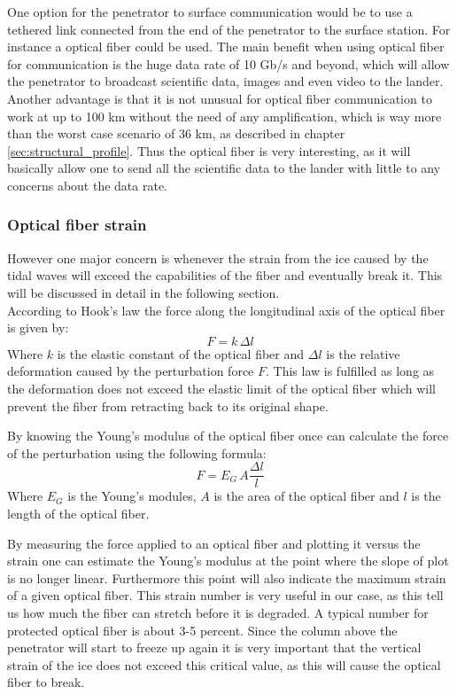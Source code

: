 One option for the penetrator to surface communication would be to use a tethered link connected from the end of the penetrator to the surface station. For instance a optical fiber could be used. The main benefit when using optical fiber for communication is the huge data rate of 10 Gb/s and beyond, which will allow the penetrator to broadcast scientific data, images and even video to the lander. Another advantage is that it is not unusual for optical fiber communication to work at up to 100 km without the need of any amplification\cite{website:optical_fiber_info}, which is way more than the worst case scenario of 36 km, as described in chapter \ref{sec:structural_profile}. Thus the optical fiber is very interesting, as it will basically allow one to send all the scientific data to the lander with little to any concerns about the data rate.

\subsubsection{Optical fiber strain}

However one major concern is whenever the strain from the ice caused by the tidal waves will exceed the capabilities of the fiber and eventually break it. This will be discussed in detail in the following section.\\

\noindent
According to Hook's law the force along the longitudinal axis of the optical fiber is given by:
\begin{equation}
	 F = k \, \Delta l
\end{equation}
Where $k$ is the elastic constant of the optical fiber and $\Delta l$ is the relative deformation caused by the perturbation force $F$. This law is fulfilled as long as the deformation does not exceed the elastic limit of the optical fiber which will prevent the fiber from retracting back to its original shape.

By knowing the Young's modulus of the optical fiber once can calculate the force of the perturbation using the following formula:
\begin{equation}
	F = E_G \, A \frac{\Delta l}{l}
\end{equation}
Where $E_G$ is the Young's modules, $A$ is the area of the optical fiber and $l$ is the length of the optical fiber.

By measuring the force applied to an optical fiber and plotting it versus the strain one can estimate the Young's modulus at the point where the slope of plot is no longer linear. Furthermore this point will also indicate the maximum strain of a given optical fiber. This strain number is very useful in our case, as this tell us how much the fiber can stretch before it is degraded. A typical number for protected optical fiber is about 3-5 percent\cite{article:optical_fiber_properties,article:optical_fiber_mechanical}. Since the column above the penetrator will start to freeze up again it is very important that the vertical strain of the ice does not exceed this critical value, as this will cause the optical fiber to break.

